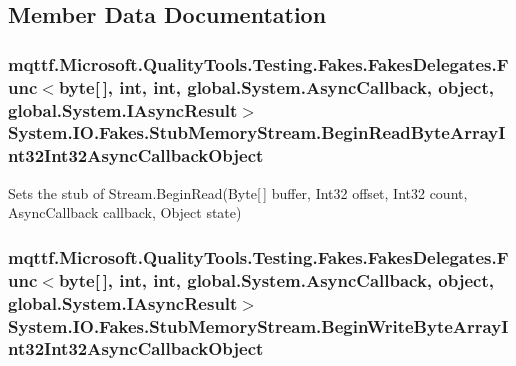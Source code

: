 \subsection{Member Data Documentation}
\hypertarget{class_system_1_1_i_o_1_1_fakes_1_1_stub_memory_stream_ab5ba7bbab3f39cdf4de6f2596d5509dd}{
\subsubsection[{Begin\-Read\-Byte\-Array\-Int32\-Int32\-Async\-Callback\-Object}]{\setlength{\rightskip}{0pt plus 5cm}mqttf.\-Microsoft.\-Quality\-Tools.\-Testing.\-Fakes.\-Fakes\-Delegates.\-Func$<$byte\mbox{[}$\,$\mbox{]}, int, int, global.\-System.\-Async\-Callback, object, global.\-System.\-I\-Async\-Result$>$ System.\-I\-O.\-Fakes.\-Stub\-Memory\-Stream.\-Begin\-Read\-Byte\-Array\-Int32\-Int32\-Async\-Callback\-Object}}\label{class_system_1_1_i_o_1_1_fakes_1_1_stub_memory_stream_ab5ba7bbab3f39cdf4de6f2596d5509dd}


Sets the stub of Stream.\-Begin\-Read(\-Byte\mbox{[}$\,$\mbox{]} buffer, Int32 offset, Int32 count, Async\-Callback callback, Object state)

\hypertarget{class_system_1_1_i_o_1_1_fakes_1_1_stub_memory_stream_affb9564f1d44fd4d7d2100520c4a7d7b}{
\subsubsection[{Begin\-Write\-Byte\-Array\-Int32\-Int32\-Async\-Callback\-Object}]{\setlength{\rightskip}{0pt plus 5cm}mqttf.\-Microsoft.\-Quality\-Tools.\-Testing.\-Fakes.\-Fakes\-Delegates.\-Func$<$byte\mbox{[}$\,$\mbox{]}, int, int, global.\-System.\-Async\-Callback, object, global.\-System.\-I\-Async\-Result$>$ System.\-I\-O.\-Fakes.\-Stub\-Memory\-Stream.\-Begin\-Write\-Byte\-Array\-Int32\-Int32\-Async\-Callback\-Object}}\label{class_system_1_1_i_o_1_1_fakes_1_1_stub_memory_stream_affb9564f1d44fd4d7d2100520c4a7d7b}


